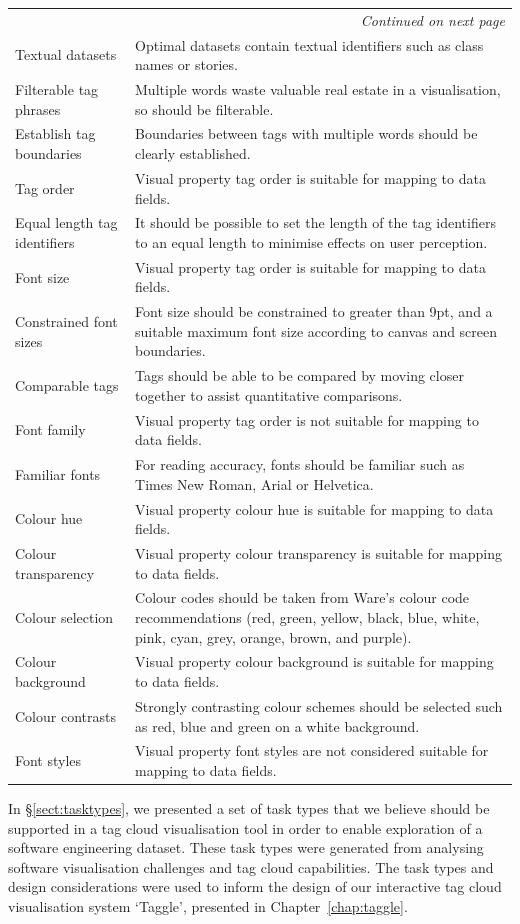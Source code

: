 \begin{longtable}{|p{5cm}|p{9cm}|}
\multicolumn{2}{r}{\textit{Continued on next page}} \\
\endfoot
\hline
\endlastfoot
Textual datasets & Optimal datasets contain textual identifiers such as class names or stories.\\
Filterable tag phrases & Multiple words waste valuable real estate in a visualisation, so should be filterable.\\
Establish tag boundaries & Boundaries between tags with multiple words should be clearly established.\\
Tag order & Visual property tag order is suitable for mapping to data fields.\\
Equal length tag identifiers & It should be possible to set the length of the tag identifiers to an equal length to minimise effects on user perception.\\
Font size & Visual property tag order is suitable for mapping to data fields.\\	
Constrained font sizes & Font size should be constrained to greater than 9pt, and a suitable maximum font size according to canvas and screen boundaries.\\
Comparable tags & Tags should be able to be compared by moving closer together to assist quantitative comparisons.\\
Font family & Visual property tag order is not suitable for mapping to data fields.\\	
Familiar fonts & For reading accuracy, fonts should be familiar such as Times New Roman, Arial or Helvetica.\\	
Colour hue & Visual property colour hue is suitable for mapping to data fields.\\	
Colour transparency & Visual property colour transparency is suitable for mapping to data fields.\\	
Colour selection & Colour codes should be taken from Ware's  colour code recommendations (red, green, yellow, black, blue, white, pink, cyan, grey, orange, brown, and purple).\\	
Colour background & Visual property colour background is suitable for mapping to data fields.\\	
Colour contrasts & Strongly contrasting colour schemes should be selected such as red, blue and green on a white background.\\	
Font styles & Visual property font styles are not considered suitable for mapping to data fields.
\label{tab:designconsiderations}
\end{longtable}


In \S\ref{sect:tasktypes}, we presented a set of task types that we believe should be supported in a tag cloud visualisation tool in order to enable exploration of a software engineering dataset. These task types were generated from analysing software visualisation challenges and tag cloud capabilities. The task types and design considerations were used to inform the design of our interactive tag cloud visualisation system `Taggle', presented in Chapter~\ref{chap:taggle}.
	


